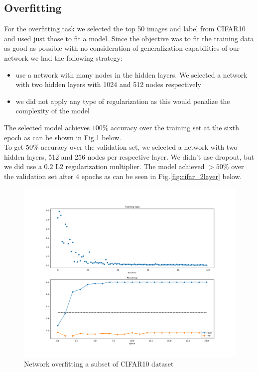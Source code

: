 \documentclass[12pt,twoside]{article}
\begin{document}
\subsection{Overfitting}
For the overfitting task we selected the top 50 images and label from CIFAR10 and used just those to fit a model. Since the objective was to fit the training data as good as possible with no consideration of generalization capabilities of our network we had the following strategy:
\begin{itemize}
\item use a network with many nodes in the hidden layers. We selected a network with two hidden layers with 1024 and 512 nodes respectively
\item we did not apply any type of regularization as this would penalize the complexity of the model
\end{itemize}

The selected model achieves $100\%$ accuracy over the training set at the sixth epoch as can be shown in Fig.\ref{fig:overfit} below.
\\

To get $50\%$ accuracy over the validation set, we selected a network with two hidden layers, 512 and 256 nodes per respective layer. We didn't use dropout, but we did use a $0.2$ L2 regularization multiplier. The model achieved $>50\%$ over the validation set after 4 epochs as can be seen in Fig.\ref{fig:cifar_2layer} below. 

\begin{figure}[H]
\centering %
\includegraphics[width = 0.8\hsize]{./figures/overfit.png} %
\caption{Network overfitting a subset of CIFAR10 dataset} %
\label{fig:overfit} %
\end{figure}
\end{document}
